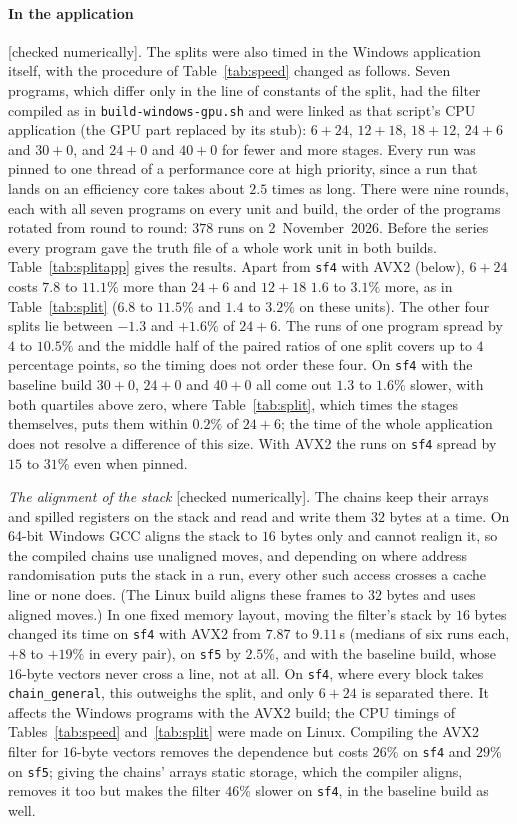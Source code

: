 \documentclass[10pt,a4paper]{article}
\newcommand{\code}[1]{\texttt{#1}}
\newcommand{\stnum}{\textsf{\small[checked numerically]}\xspace}
\theoremstyle{plain}
\theoremstyle{definition}
\begin{document}
\paragraph{In the application} \stnum.  The splits were also timed in the Windows application itself, with the procedure of Table~\ref{tab:speed} changed as
follows.  Seven programs, which differ only in the line of constants of the split, had the filter compiled as in \code{build-windows-gpu.sh} and were linked
as that script's CPU application (the GPU part replaced by its stub): $6+24$, $12+18$, $18+12$, $24+6$ and $30+0$, and $24+0$ and $40+0$ for fewer and more
stages.  Every run was pinned to one thread of a
performance core at high priority, since a run that lands on an efficiency core takes about $2.5$ times as long.  There were nine rounds, each with all seven
programs on every unit and build, the order of the programs rotated from round to round: $378$ runs on 2~November~2026.  Before the series every program gave the
truth file of a whole work unit in both builds.  Table~\ref{tab:splitapp} gives the results.  Apart from \code{sf4} with AVX2 (below), $6+24$ costs $7.8$ to
$11.1\%$ more than $24+6$ and $12+18$ $1.6$ to $3.1\%$ more, as in Table~\ref{tab:split} ($6.8$ to $11.5\%$ and $1.4$ to $3.2\%$ on these units).  The other four splits lie between $-1.3$ and $+1.6\%$ of
$24+6$.  The runs of one program spread by $4$ to $10.5\%$ and the middle half of the paired ratios of one split covers up to $4$ percentage points, so the timing
does not order these four.  On \code{sf4} with the baseline build $30+0$, $24+0$ and $40+0$ all come out $1.3$ to $1.6\%$ slower, with both quartiles above zero,
where Table~\ref{tab:split}, which times the stages themselves, puts them within $0.2\%$ of $24+6$; the time of the whole application does not resolve a difference
of this size.  With AVX2 the runs on \code{sf4} spread by $15$ to $31\%$ even when pinned.

\emph{The alignment of the stack} \stnum.  The chains keep their arrays and spilled registers on the stack and read and write them $32$ bytes at a time.  On 64-bit
Windows GCC aligns the stack to $16$ bytes only and cannot realign it, so the compiled chains use unaligned moves, and depending on where address randomisation
puts the stack in a run, every other such access crosses a cache line or none does.  (The Linux build aligns these frames to $32$ bytes and uses aligned moves.)  In
one fixed memory layout, moving the filter's stack by $16$ bytes changed its time on \code{sf4} with AVX2 from $7.87$ to $9.11$\,s (medians of six runs each, $+8$
to $+19\%$ in every pair), on \code{sf5} by $2.5\%$, and with the baseline build, whose $16$-byte vectors never cross a line, not at all.  On \code{sf4}, where every
block takes \code{chain\_general}, this outweighs the split, and only $6+24$ is separated there.  It affects the Windows programs with the AVX2 build; the CPU timings of
Tables~\ref{tab:speed} and~\ref{tab:split} were made on Linux.  Compiling the AVX2 filter for $16$-byte vectors removes the dependence but costs $26\%$ on
\code{sf4} and $29\%$ on \code{sf5}; giving the chains' arrays static storage, which the compiler aligns, removes it too but makes the filter $46\%$ slower on
\code{sf4}, in the baseline build as well.
\end{document}
